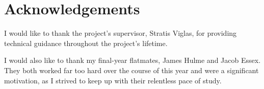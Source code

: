 \documentclass[12pt, bsc,frontabs,twoside,singlespacing,parskip]{infthesis}
\begin{document}
\fontsize{12pt}{12pt}

\abstract{}
\maketitle

\section*{Acknowledgements}
I would like to thank the project's supervisor, Stratis Viglas, for providing technical guidance throughout the project's lifetime.

I would also like to thank my final-year flatmates, James Hulme and Jacob Essex. They both worked far too hard over the course of this year and were a significant motivation, as I strived to keep up with their relentless pace of study.

\tableofcontents

\raggedbottom

\newpage
{}














{}

\end{document}
